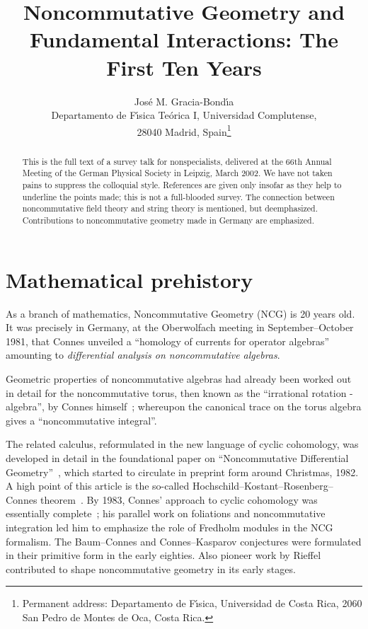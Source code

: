 \documentclass[a4paper,12pt]{article}
\title{Noncommutative Geometry and Fundamental Interactions:
The First Ten Years}
\author{
Jos\'e M. Gracia-Bond\'{\i}a\\[1pc]
Departamento de F\'{\i}sica Te\'orica I, Universidad Complutense,\\
28040 Madrid, Spain\thanks{
Permanent address: 
Departamento de F\'{\i}sica, Universidad de Costa Rica,
2060 San Pedro de Montes de Oca, Costa Rica.}}
\providecommand{\1}{\mathbf{1}}         %
\providecommand{\7}{\dagger}            %
\providecommand{\8}{\bullet}            %
\renewcommand{\.}{\cdot}            %
\renewcommand{\:}{\colon}           %
\begin{document}
\maketitle


\begin{abstract}
This is the full text of a survey talk for nonspecialists, delivered
at the 66th Annual Meeting of the German Physical Society in Leipzig,
March 2002. We have not taken pains to suppress the colloquial style.
References are given only insofar as they help to underline the points
made; this is not a full-blooded survey. The connection between
noncommutative field theory and string theory is mentioned, but
deemphasized. Contributions to noncommutative geometry made in Germany
are emphasized.
\end{abstract}


\section{Mathematical prehistory}

As a branch of mathematics, Noncommutative Geometry (NCG) is 20 years
old. It was precisely in Germany, at the Oberwolfach meeting in
September--October 1981, that Connes unveiled a ``homology of currents
for operator algebras''~\cite{ConnesObW} amounting to
\textit{differential analysis on noncommutative algebras}.

Geometric properties of noncommutative algebras had already been
worked out in detail for the noncommutative torus, then known as the
``irrational rotation \coordHE{}-algebra'', by Connes
himself~\cite{ConnesTorus}; whereupon the canonical trace on the torus
algebra gives a ``noncommutative integral''.

The related calculus, reformulated in the new language of cyclic
cohomology, was developed in detail in the foundational paper on
``Noncommutative Differential Geometry''~\cite{ConnesNCDiffG}, which
started to circulate in preprint form around Christmas, 1982. A high
point of this article is the so-called
Hochschild--Kostant--Rosenberg--Connes theorem~\cite{Polaris}. By
1983, Connes' approach to cyclic cohomology was essentially
complete~\cite{ConnesLambda}; his parallel work on foliations and
noncommutative integration led him to emphasize the role of Fredholm
modules in the NCG formalism. The Baum--Connes and Connes--Kasparov
conjectures were formulated in their primitive form in the early
eighties. Also pioneer work by Rieffel~\cite{RieffelRot} contributed
to shape noncommutative geometry in its early stages.
\end{document}
